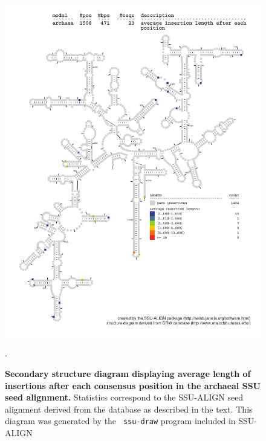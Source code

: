 \begin{figure}
\begin{center}
\includegraphics[width=5.64in]{Figures/archaea-0p1-iavglen}
\end{center}
\caption[Secondary structure diagram displaying average length of insertions
  after each consensus position in the archaeal SSU seed
  alignment]{\textbf{Secondary structure diagram displaying average
    length of insertions after each consensus position in the archaeal SSU seed
  alignment.} Statistics correspond to the SSU-ALIGN seed
  alignment derived from the  database \cite{CannoneGutell02}
  as described in the text. This diagram was generated by the {\tt
  ssu-draw} program included in SSU-ALIGN}.
\label{fig:arciavglen}
\end{figure}


\newpage 

